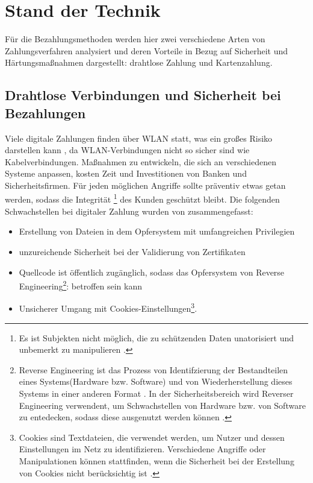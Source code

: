 \section{Stand der Technik}

Für die Bezahlungsmethoden werden hier zwei verschiedene Arten von Zahlungsverfahren analysiert und deren
Vorteile in Bezug auf Sicherheit und Härtungsmaßnahmen dargestellt: drahtlose Zahlung und Kartenzahlung.

\subsection{Drahtlose Verbindungen und Sicherheit bei Bezahlungen}

Viele digitale Zahlungen finden über WLAN statt, was ein großes Risiko darstellen kann \cite{refip:NYRS}, 
da WLAN-Verbindungen nicht so sicher sind wie Kabelverbindungen. Maßnahmen zu entwickeln, die sich an 
verschiedenen Systeme anpassen, kosten Zeit und Investitionen von Banken und Sicherheitsfirmen. 
Für jeden möglichen Angriffe sollte präventiv etwas getan werden, sodass die Integrität 
\footnote{Es ist Subjekten nicht möglich, die zu schützenden Daten unatorisiert und unbemerkt zu manipulieren \cite{refbook:SWIS}.}
des Kunden geschützt bleibt. Die folgenden Schwachstellen bei digitaler Zahlung wurden von \cite{refip:NYRS}
zusammengefasst:

\begin{itemize}
    \item Erstellung von Dateien in dem Opfersystem mit umfangreichen Privilegien
    \item unzureichende Sicherheit bei der Validierung von Zertifikaten
    \item Quellcode ist öffentlich zugänglich, sodass das Opfersystem von Reverse
    Engineering\footnote{Reverse Engineering ist das Prozess von Identifzierung der Bestandteilen 
    eines Systems(Hardware bzw. Software) und von Wiederherstellung dieses Systems in einer anderen Format
    \cite{refart:CHRE}. In der Sicherheitsbereich wird Reverser Engineering verwendent, um Schwachstellen 
    von Hardware bzw. von Software zu entedecken, sodass diese ausgenutzt werden können \cite{refip:CMBM}.}: 
    betroffen sein kann
    \item Unsicherer Umgang mit Cookies-Einstellungen\footnote{Cookies sind Textdateien, die verwendet werden, um Nutzer und
    dessen Einstellungen im Netz zu identifizieren. Verschiedene Angriffe oder Manipulationen können stattfinden,
    wenn die Sicherheit bei der Erstellung von Cookies nicht berücksichtig ist \cite{refart:HSSC}.}.
\end{itemize}



